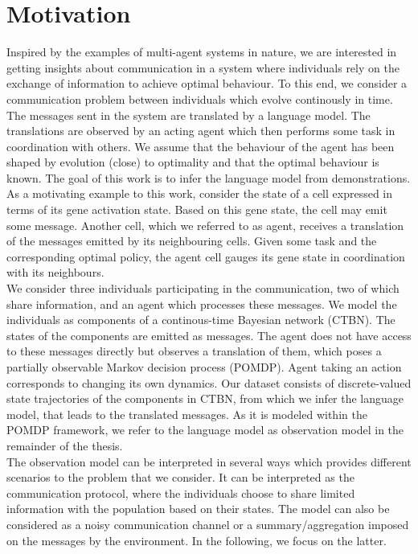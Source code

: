 \section{Motivation}
Inspired by the examples of multi-agent systems in nature, we are interested in getting insights about communication in a system where individuals rely on the exchange of information to achieve optimal behaviour. To this end, we consider a communication problem between individuals which evolve continously in time. The messages sent in the system are translated by a language model. The translations are observed by an acting agent which then performs some task in coordination with others. We assume that the behaviour of the agent has been shaped by evolution (close) to optimality and that the optimal behaviour is known. The goal of this work is to infer the language model from demonstrations.\\
As a motivating example to this work, consider the state of a cell expressed in terms of its gene activation state. Based on this gene state, the cell may emit some message. Another cell, which we referred to as agent, receives a translation of the messages emitted by its neighbouring cells. Given some task and the corresponding optimal policy, the agent cell gauges its gene state in coordination with its neighbours.\\
We consider three individuals participating in the communication, two of which share information, and an agent which processes these messages. We model the individuals as components of a continous-time Bayesian network (CTBN). The states of the components are emitted as messages. The agent does not have access to these messages directly but observes a translation of them, which poses a partially observable Markov decision process (POMDP). Agent taking an action corresponds to changing its own dynamics. Our dataset consists of discrete-valued state trajectories of the components in CTBN, from which we infer the language model, that leads to the translated messages. As it is modeled within the POMDP framework, we refer to the language model as observation model in the remainder of the thesis.\\
The observation model can be interpreted in several ways which provides different scenarios to the problem that we consider. It can be interpreted as the communication protocol, where the individuals choose to share limited information with the population based on their states. The model can also be considered as a noisy communication channel or a summary/aggregation imposed on the messages by the environment. In the following, we focus on the latter.
\pagebreak
